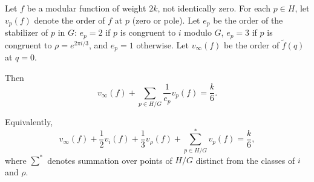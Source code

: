 Let $f$ be a modular function of weight $2k$, not identically zero. For each $p \in H$, let $v_p(f)$ denote the order of $f$ at $p$ (zero or pole). Let $e_p$ be the order of the stabilizer of $p$ in $G$: $e_p = 2$ if $p$ is congruent to $i$ modulo $G$, $e_p = 3$ if $p$ is congruent to $\rho = e^{2\pi i/3}$, and $e_p = 1$ otherwise. Let $v_\infty(f)$ be the order of $\tilde{f}(q)$ at $q = 0$.

Then
$$v_\infty(f) + \sum_{p \in H/G} \frac{1}{e_p} v_p(f) = \frac{k}{6}.$$

Equivalently,
$$v_\infty(f) + \frac{1}{2} v_i(f) + \frac{1}{3} v_\rho(f) + \sum_{p \in H/G}^* v_p(f) = \frac{k}{6},$$
where $\sum^*$ denotes summation over points of $H/G$ distinct from the classes of $i$ and $\rho$.

